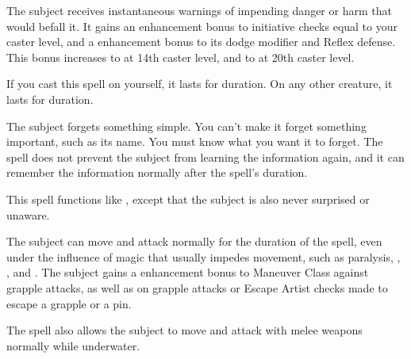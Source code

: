 \begin{spelleffect} 
    The subject receives instantaneous warnings of impending danger or harm that would befall it. It gains an enhancement bonus to initiative checks equal to your caster level, and a  enhancement bonus to its dodge modifier and Reflex defense. This bonus increases to  at 14th caster level, and to  at 20th caster level.
  \par If you cast this spell on yourself, it lasts for \durlong duration. On any other creature, it lasts for \durshort duration.
\end{spelleffect}

\spellrng{\rngmed}
\spelldur{\durlong}
\begin{spelleffect}
    The subject forgets something simple. You can't make it forget something important, such as its name. You must know what you want it to forget. The spell does not prevent the subject from learning the information again, and it can remember the information normally after the spell's duration.
\end{spelleffect}

\begin{spelleffect}
    This spell functions like , except that the subject is also never surprised or unaware.
\end{spelleffect}

\spellrng{\rngtouch}
\spelldur{\durshort}
\begin{spelleffect}
  The subject can move and attack normally for the duration of the spell, even under the influence of magic that usually impedes movement, such as paralysis, , , and . The subject gains a  enhancement bonus to Maneuver Class against grapple attacks, as well as on grapple attacks or Escape Artist checks made to escape a grapple or a pin.
  \par The spell also allows the subject to move and attack with melee weapons normally while underwater.
\end{spelleffect}

